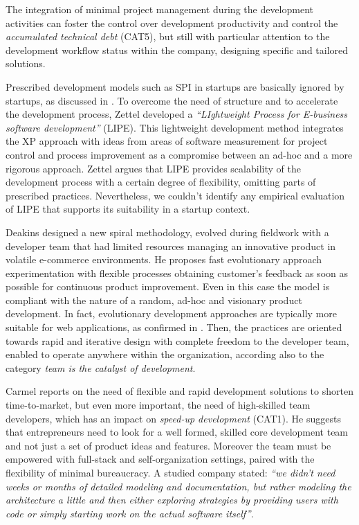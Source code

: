 \documentclass[10pt,journal,letterpaper,compsoc]{IEEEtran}
\begin{document}
The integration of minimal project management during the development activities 
can foster the control over development productivity and control the 
\textit{accumulated technical debt} (CAT5), but still with particular attention 
to the development workflow status within the company, designing specific and 
tailored solutions. 

Prescribed development models such as SPI in startups are basically ignored by 
startups, as discussed in \cite{Zettel2001}. %
To overcome the need of structure and to accelerate the development process, 
Zettel developed a \textit{``LIghtweight Process for E-business software 
development''} (LIPE). This lightweight development method integrates the XP 
approach with ideas from areas of software measurement for project control and 
process improvement as a compromise between an ad-hoc and a more rigorous 
approach. Zettel argues that LIPE provides scalability of the development 
process with a certain degree of flexibility, omitting parts of prescribed 
practices. Nevertheless, we couldn't identify any empirical evaluation of LIPE 
that supports its suitability in a startup context.


Deakins \cite{Deakins2005} designed a new spiral methodology, evolved during 
fieldwork with a developer team that had limited resources managing an 
innovative product in volatile e-commerce environments. He proposes fast 
evolutionary approach experimentation with flexible processes obtaining 
customer's feedback as soon as possible for continuous product improvement.%
Even in this case the model%
is compliant with the nature of a random, ad-hoc and visionary product 
development. In fact, evolutionary development approaches are typically more 
suitable  for web applications, as confirmed in \cite{Deshpande2001}. Then, the 
practices are oriented towards rapid and iterative design with complete freedom 
to the developer team, enabled to operate anywhere within the organization, 
according also to the category \textit{team is the catalyst of 
development}.%

Carmel \cite{Camel1994a} reports on the need of flexible and rapid development 
solutions to shorten time-to-market, but even more important, the need of 
high-skilled team developers, which has an impact on \textit{speed-up 
development} (CAT1). He suggests that entrepreneurs need to look for a well 
formed, skilled core development team and not just a set of product ideas and 
features. Moreover the team must be empowered with full-stack and 
self-organization settings, paired with the flexibility of minimal bureaucracy. 
A studied company stated: \textit{``we didn't need weeks or months of detailed 
modeling and documentation, but rather modeling the architecture a little and 
then either exploring strategies by providing users with code or simply starting 
work on the actual software itself''}.
\end{document}
